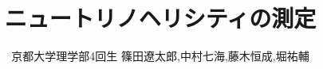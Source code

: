 \documentclass[uplatex,11pt,a4paper,dvipdfmx]{jsreport}
\begin{document}
\title{ニュートリノヘリシティの測定}
\author{京都大学理学部4回生 篠田遼太郎,中村七海,藤木恒成,堀祐輔}
\maketitle
\end{document}
